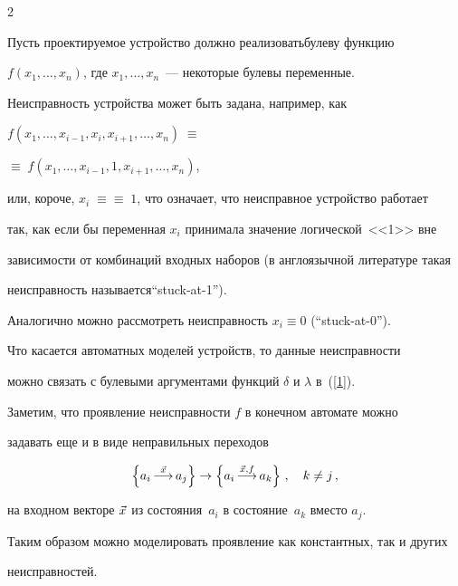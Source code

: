\begin{multicols}{2}
\begin{table}[b]
\end{table}


Пусть проектируемое устройство должно реализовать\linebreak булеву функцию


$f(x_1,\ldots,x_n)$, где $x_1,\ldots,x_n$~--- некоторые булевы переменные.


Неисправность устройства может быть задана, например, как


$f(x_1,\ldots,x_{i-1},x_i,x_{i+1},\ldots,x_n)\;\equiv$\linebreak


$\equiv\;f(x_1,\ldots,x_{i-1},1,x_{i+1},\ldots,x_n)$,


или, короче, $x_i\;\equiv$\linebreak $\equiv\;1$, что означает, что неисправное устройство работает


так, как если бы переменная $x_i$ принимала значение логической~<<1>> вне


зависимости от комбинаций входных наборов (в англоязычной литературе такая


неисправность называется\linebreak ``stuck-at-1'').


Аналогично можно рассмотреть неисправность $x_i \equiv 0$ (``stuck-at-0'').





 Что касается автоматных моделей устройств, то данные неисправности


можно связать с булевыми аргументами функций $\delta$ и $\lambda$ в~(\ref{1}).





 Заметим, что проявление неисправности $f$ в конечном автомате можно


задавать еще и в виде неправильных переходов


$$


\left \{a_i\mathop{\longrightarrow}\limits^{\v x} a_j\right \} \to


\left \{a_i\mathop{\longrightarrow}\limits^{\v x,f} a_k\right \}\,,


\quad k\ne j\,, %


$$


на входном векторе $\vec x$ из состояния~$a_i$ в состояние~$a_k$ вместо $a_j$.


Таким образом можно моделировать проявление как константных, так и других


неисправностей.






\end{multicols}
